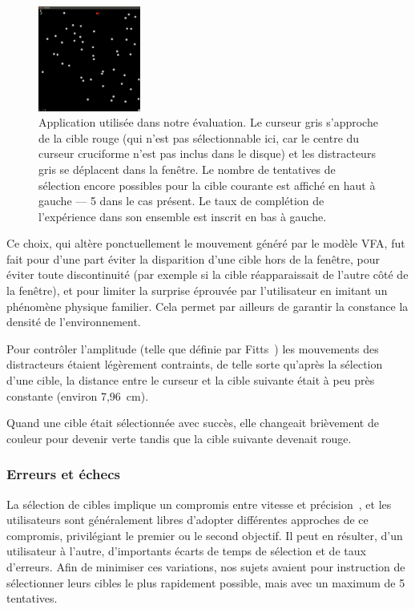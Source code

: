 	\begin{figure}
		\centering
		\includegraphics[width=0.3\textwidth]{figures/ch4/app}
		\caption[Application utilisée dans notre évaluation]{Application utilisée dans notre évaluation. Le curseur gris s'approche de la cible rouge (qui n'est pas sélectionnable ici, car le centre du curseur cruciforme n'est pas inclus dans le disque) et les distracteurs gris se déplacent dans la fenêtre. Le nombre de tentatives de sélection encore possibles pour la cible courante est affiché en haut à gauche --- 5 dans le cas présent. Le taux de complétion de l'expérience dans son ensemble est inscrit en bas à gauche.}
		\label{fig:app}
	\end{figure}
	
	Ce choix, qui altère ponctuellement le mouvement généré par le modèle VFA, fut fait pour d'une part éviter la disparition d'une cible hors de la fenêtre, pour éviter toute discontinuité (par exemple si la cible réapparaissait de l'autre côté de la fenêtre), et pour limiter la \og surprise \fg{} éprouvée par l'utilisateur en imitant un phénomène physique familier. Cela permet par ailleurs de garantir la constance la densité de l'environnement.
	
	Pour contrôler l'amplitude (telle que définie par Fitts~\cite{fitts1954information}) les mouvements des distracteurs étaient légèrement contraints, de telle sorte qu'après la sélection d'une cible, la distance entre le curseur et la cible suivante était à peu près constante (environ 7,96~cm).
	
	Quand une cible était sélectionnée avec succès, elle changeait brièvement de couleur pour devenir verte tandis que la cible suivante devenait rouge.
	
	\subsubsection{Erreurs et échecs}
	La sélection de cibles implique un compromis entre vitesse et précision~\cite{guiard2011fitt}, et les utilisateurs sont généralement libres d'adopter différentes approches de ce compromis, privilégiant le premier ou le second objectif. Il peut en résulter, d'un utilisateur à l'autre, d'importants écarts de temps de sélection et de taux d'erreurs. Afin de minimiser ces variations, nos sujets avaient pour instruction de sélectionner leurs cibles le plus rapidement possible, mais avec un maximum de 5 tentatives.
	
